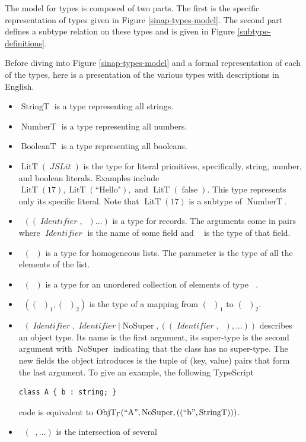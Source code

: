 \documentclass[12pt]{article}
\DeclareMathOperator{\StringT}{StringT}
\DeclareMathOperator{\NumberT}{NumberT}
\DeclareMathOperator{\BooleanT}{BooleanT}
\DeclareMathOperator{\LitT}{LitT}
\DeclareMathOperator{\JSLit}{\textit{JSLit}}
\DeclareMathOperator{\RecT}{RecT_\Gamma}
\DeclareMathOperator{\ObjT}{ObjT_\Gamma}
\DeclareMathOperator{\ListT}{ListT_\Gamma}
\DeclareMathOperator{\SetT}{SetT_\Gamma}
\DeclareMathOperator{\MapT}{MapT_\Gamma}
\DeclareMathOperator{\InterT}{InterT_\Gamma}
\DeclareMathOperator{\Identifier}{\textit{Identifier}}
\DeclareMathOperator{\Type}{{\textit{Type}_\Gamma}}
\DeclareMathOperator{\NoSuper}{NoSuper}
\begin{document}
The model for types is composed of two parts. The first is the 
specific representation of types given in Figure 
\ref{sinap-types-model}. The second part defines a subtype
relation on these types and is given in Figure \ref{subtype-definitions}.

Before diving into Figure \ref{sinap-types-model} and 
a formal representation of each of the types, here is a presentation 
of the various types with descriptions in English. 
\begin{itemize}
    \item \(\StringT\) is a type representing all strings.
    \item \(\NumberT\) is a type representing all numbers.
    \item \(\BooleanT\) is a type representing all booleans.
    \item \(\LitT(\JSLit)\) is the type for literal primitives, specifically,
    string, number, and boolean literals. 
    Examples include \(\LitT(17), \LitT(\text{``Hello"}), \text{ and } 
    \LitT(\operatorname{false})\). This type represents only its specific literal. 
    Note that \(\LitT(17)\) is a subtype of \(\NumberT\).
    \item \(\RecT((\Identifier, \Type)...)\) is a type for records. 
    The arguments come in pairs where
    \(\Identifier\) is the name of some field and \(\Type\) is the
    type of that field.
    \item \(\ListT(\Type)\) is a type for homogeneous lists. The
    parameter is the type of all the elements of the list. 
    \item \(\SetT(\Type)\) is a type for an unordered collection
    of elements of type \(\Type\).
    \item \(\MapT((\Type)_1, (\Type)_2)\) is the type of a mapping from 
    \((\Type)_1\) to \((\Type)_2\).
    \item \(\ObjT(\Identifier, \Identifier | \NoSuper, ((\Identifier, \Type), ...))\)
    describes an object type. Its name is the first argument, 
    its super-type is the second argument with \(\NoSuper\) indicating that
    the class has no super-type. The new fields 
    the object introduces is the tuple of (key, value) pairs that form the
    last argument. To give an example, the following TypeScript
    \begin{verbatim}
class A { b : string; }
    \end{verbatim} 
    code is equivalent to \(\ObjT(``\text{A}", \NoSuper, 
    ((``\text{b}", \StringT)))\). 
    \item \(\InterT(\ObjT,  ...)\) is the intersection of several 

\end{itemize}
\end{document}
